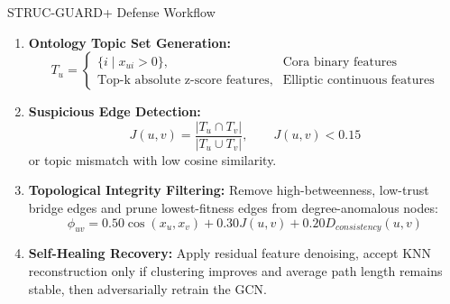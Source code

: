 \documentclass{beamer}
\begin{document}
\begin{frame}{STRUC-GUARD+ Defense Workflow}
\small
\begin{enumerate}
    \item \textbf{Ontology Topic Set Generation:}
    \[
        T_u =
        \begin{cases}
        \{i \mid x_{ui}>0\}, & \text{Cora binary features}\\
        \text{Top-k absolute z-score features}, & \text{Elliptic continuous features}
        \end{cases}
    \]
    \item \textbf{Suspicious Edge Detection:}
    \[
        J(u,v)=\frac{|T_u \cap T_v|}{|T_u \cup T_v|}, \qquad
        J(u,v)<0.15
    \]
    or topic mismatch with low cosine similarity.
    \item \textbf{Topological Integrity Filtering:} Remove high-betweenness, low-trust bridge edges and prune lowest-fitness edges from degree-anomalous nodes:
    \[
        \phi_{uv}=0.50\cos(x_u,x_v)+0.30J(u,v)+0.20D_{consistency}(u,v)
    \]
    \item \textbf{Self-Healing Recovery:} Apply residual feature denoising, accept KNN reconstruction only if clustering improves and average path length remains stable, then adversarially retrain the GCN.
\end{enumerate}
\end{frame}
\end{document}
